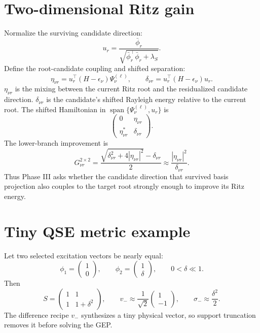 \documentclass[10pt,twocolumn]{article}
\newcommand{\spanop}{\operatorname{span}}
\begin{document}
\section{Two-dimensional Ritz gain}

Normalize the surviving candidate direction:
\begin{equation}
u_r=\frac{\bar\phi_r}{\sqrt{\bar\phi_r^\top\bar\phi_r+\lambda_S}}.
\label{eq:p3_ur}
\end{equation}
Define the root-candidate coupling and shifted separation:
\begin{equation}
\eta_{\nu r}=u_r^\top(H-\epsilon_\nu)\Psi_\nu^{(\ell)},
\qquad
\delta_{\nu r}=u_r^\top(H-\epsilon_\nu)u_r.
\label{eq:p3_eta_delta}
\end{equation}
\(\eta_{\nu r}\) is the mixing between the current Ritz root and the residualized candidate direction. \(\delta_{\nu r}\) is the candidate's shifted Rayleigh energy relative to the current root.
The shifted Hamiltonian in \(\spanop\{\Psi_\nu^{(\ell)},u_r\}\) is
\begin{equation}
\begin{pmatrix}
0&\eta_{\nu r}\\
\eta_{\nu r}^*&\delta_{\nu r}
\end{pmatrix}.
\label{eq:p3_2x2_block}
\end{equation}
The lower-branch improvement is
\begin{equation}
\boxed{
G_{\nu r}^{2\times2}
=\frac{\sqrt{\delta_{\nu r}^2+4|\eta_{\nu r}|^2}-\delta_{\nu r}}{2}
\approx\frac{|\eta_{\nu r}|^2}{\delta_{\nu r}}.
}
\label{eq:p3_2x2_gain}
\end{equation}
Thus Phase III asks whether the candidate direction that survived basis projection also couples to the target root strongly enough to improve its Ritz energy.

\appendix
\section{Tiny QSE metric example}

Let two selected excitation vectors be nearly equal:
\begin{equation}
\phi_1=\begin{pmatrix}1\\0\end{pmatrix},
\qquad
\phi_2=\begin{pmatrix}1\\\delta\end{pmatrix},
\qquad 0<\delta\ll1.
\end{equation}
Then
\begin{equation}
S=\begin{pmatrix}1&1\\1&1+\delta^2\end{pmatrix},
\qquad
v_-\approx\frac1{\sqrt2}\begin{pmatrix}1\\-1\end{pmatrix},
\qquad
\sigma_-\approx\frac{\delta^2}{2}.
\end{equation}
The difference recipe \(v_-\) synthesizes a tiny physical vector, so support truncation removes it before solving the GEP.
\end{document}
